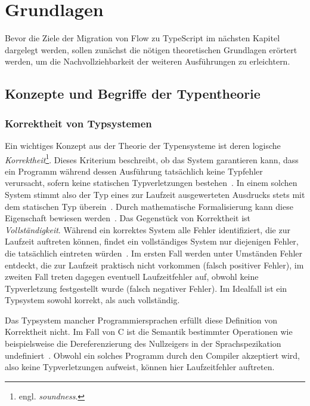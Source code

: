 \chapter{Grundlagen}
\label{chap:basics}

Bevor die Ziele der Migration von Flow zu TypeScript im nächsten Kapitel dargelegt werden, sollen zunächst die nötigen theoretischen Grundlagen erörtert werden, um die Nachvollziehbarkeit der weiteren Ausführungen zu erleichtern.

\section{Konzepte und Begriffe der Typentheorie}

\subsection{Korrektheit von Typsystemen}
Ein wichtiges Konzept aus der Theorie der Typensysteme ist deren logische \textit{Korrektheit}\footnote{engl. \textit{soundness}.}. Dieses Kriterium beschreibt, ob das System garantieren kann, dass ein Programm während dessen Ausführung tatsächlich keine Typfehler verursacht, sofern keine statischen Typverletzungen bestehen~\autocite{WRIGHT:1994}. In einem solchen System stimmt also der Typ eines zur Laufzeit ausgewerteten Ausdrucks stets mit dem statischen Typ überein~\autocite{DART:TYPE_SYSTEM}. Durch mathematische Formalisierung kann diese Eigenschaft bewiesen werden~\autocite[7]{CARDELLI:TYPE_SYSTEMS}. Das Gegenstück von Korrektheit ist \textit{Vollständigkeit}. Während ein korrektes System alle Fehler identifiziert, die zur Laufzeit auftreten können, findet ein vollständiges System nur diejenigen Fehler, die tatsächlich eintreten würden~\autocite{FLOW:TYPES_AND_EXPRESSIONS}. Im ersten Fall werden unter Umständen Fehler entdeckt, die zur Laufzeit praktisch nicht vorkommen (falsch positiver Fehler), im zweiten Fall treten dagegen eventuell Laufzeitfehler auf, obwohl keine Typverletzung festgestellt wurde (falsch negativer Fehler). Im Idealfall ist ein Typsystem sowohl korrekt, als auch vollständig.

Das Typsystem mancher Programmiersprachen erfüllt diese Definition von Korrektheit nicht. Im Fall von C ist die Semantik bestimmter Operationen wie beispielsweise die Dereferenzierung des Nullzeigers in der Sprachspezikation undefiniert~\autocite[79]{ISO:C99}. Obwohl ein solches Programm durch den Compiler akzeptiert wird, also keine Typverletzungen aufweist, können hier Laufzeitfehler auftreten.

